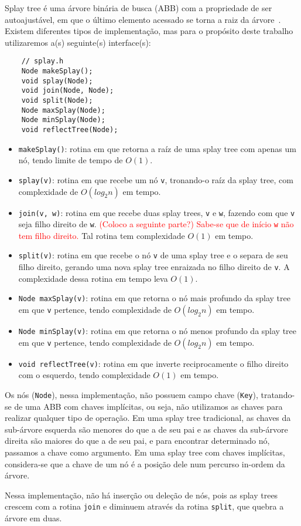 Splay tree é uma árvore binária de busca (ABB) com a propriedade de ser autoajustável, em que o último elemento acessado se torna a raiz da árvore~\cite{SleatorT1985}. Existem diferentes tipos de implementação, mas para o propósito deste trabalho utilizaremos a(s) seguinte(s) interface(s):  

\begin{verbatim}
    // splay.h
    Node makeSplay();
    void splay(Node);
    void join(Node, Node);
    void split(Node);
    Node maxSplay(Node);
    Node minSplay(Node);
    void reflectTree(Node);
\end{verbatim}


\begin{itemize}
    \item \texttt{makeSplay()}: rotina em que retorna a raíz de uma splay tree com apenas um nó, tendo limite de tempo de $O(1)$.  
    \item \texttt{splay(v)}: rotina em que recebe um nó \texttt{v}, tronando-o raíz da splay tree, com complexidade de $O(log_2 n)$ em tempo.  
    \item \texttt{join(v, w)}: rotina em que recebe duas splay trees, \texttt{v} e \texttt{w}, fazendo com que \texttt{v} seja filho direito de \texttt{w}.  \textcolor{red}{(Coloco a seguinte parte?) Sabe-se que de início \texttt{w} não tem filho direito.} Tal rotina tem complexidade $O(1)$ em tempo.  
    \item \texttt{split(v)}: rotina em que recebe o nó \texttt{v} de uma splay tree e o separa de seu filho direito, gerando uma nova splay tree enraizada no filho direito de \texttt{v}. A complexidade dessa rotina em tempo leva $O(1)$.  
    \item \texttt{Node maxSplay(v)}: rotina em que retorna o nó mais profundo da splay tree em que \texttt{v} pertence, tendo complexidade de $O(log_2 n)$ em tempo.  
    \item \texttt{Node minSplay(v)}: rotina em que retorna o nó menos profundo da splay tree em que \texttt{v} pertence, tendo complexidade de $O(log_2 n)$ em tempo.  
    \item \texttt{void reflectTree(v)}: rotina em que inverte reciprocamente o filho direito com o esquerdo, tendo complexidade $O(1)$ em tempo.  


\end{itemize}

Os nós (\texttt{Node}), nessa implementação, não possuem campo chave (\texttt{Key}), tratando-se de uma ABB com chaves implícitas, ou seja, não utilizamos as chaves para realizar qualquer tipo de operação. Em uma splay tree tradicional, as chaves da sub-árvore esquerda são menores do que a de seu pai e as chaves da sub-árvore direita são maiores do que a de seu pai, e para encontrar determinado nó, passamos a chave como argumento.  
Em uma splay tree com chaves implícitas, considera-se que a chave de um nó é a posição dele num percurso in-ordem da árvore.  

Nessa implementação, não há inserção ou deleção de nós, pois as splay trees crescem com a rotina \texttt{join} e diminuem através da rotina \texttt{split}, que quebra a árvore em duas.  

\newpage

